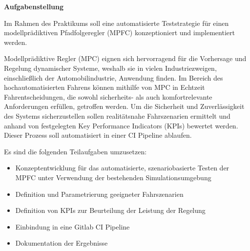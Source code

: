 \noindent\textbf{Aufgabenstellung}\smallskip

\noindent Im Rahmen des Praktikums soll eine automatisierte Teststrategie für einen modellprädiktiven Pfadfolgeregler (MPFC) konzeptioniert und implementiert werden.

Modellprädiktive Regler (MPC) eignen sich hervorragend für die Vorhersage und Regelung dynamischer Systeme, weshalb sie in vielen Industriezweigen, einschließlich der Automobilindustrie, Anwendung finden. Im Bereich des hochautomatisierten Fahrens können mithilfe von MPC in Echtzeit Fahrentscheidungen, die sowohl sicherheits- als auch komfortrelevante Anforderungen erfüllen, getroffen werden. Um die Sicherheit und Zuverlässigkeit des Systems sicherzustellen sollen realitätsnahe Fahrszenarien ermittelt und anhand von festgelegten Key Performance Indicators (KPIs) bewertet werden. Dieser Prozess soll automatisiert in einer CI Pipeline ablaufen.\medskip

\noindent Es sind die folgenden Teilaufgaben umzusetzen:
\begin{itemize}
    \item Konzeptentwicklung für das automatisierte, szenariobasierte Testen der MPFC unter Verwendung der bestehenden Simulationsumgebung
    \item Definition und Parametrierung geeigneter Fahrszenarien
    \item Definition von KPIs zur Beurteilung der Leistung der Regelung
    \item Einbindung in eine Gitlab CI Pipeline
    \item Dokumentation der Ergebnisse
\end{itemize}
